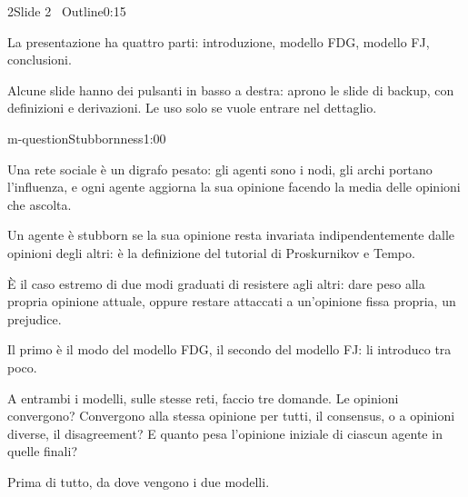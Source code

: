 \begin{slidepag}{2}{Slide 2 \textperiodcentered\ Outline}{0:15}
  \begin{discorso}
    \item La presentazione ha quattro parti: introduzione, modello FDG, modello FJ, conclusioni.
    \item Alcune slide hanno dei pulsanti in basso a destra: aprono le slide di backup, con definizioni e derivazioni. Le uso solo se vuole entrare nel dettaglio.
  \end{discorso}
\end{slidepag}

\begin{slide}{m-question}{Stubbornness}{1:00}
  \begin{discorso}
    \item Una rete sociale è un digrafo pesato: gli agenti sono i nodi, gli archi portano l'influenza, e ogni agente aggiorna la sua opinione facendo la media delle opinioni che ascolta.
    \item Un agente è stubborn se la sua opinione resta invariata indipendentemente dalle opinioni degli altri: è la definizione del tutorial di Proskurnikov e Tempo.
    \item È il caso estremo di due modi graduati di resistere agli altri: dare peso alla propria opinione attuale, oppure restare attaccati a un'opinione fissa propria, un {\color{red}} {\color{blue}prejudice.}
    \item Il primo è il modo del modello FDG, il secondo del modello FJ: li introduco tra poco.
    \item A entrambi i modelli, sulle stesse reti, faccio tre domande. Le opinioni convergono? Convergono alla stessa opinione per tutti, il {\color{red}} {\color{blue}consensus,} o a opinioni diverse, il {\color{red}} {\color{blue}disagreement?} E quanto pesa l'opinione iniziale di ciascun agente in quelle finali?
    \item Prima di tutto, da dove vengono i due modelli.
  \end{discorso}
\end{slide}

